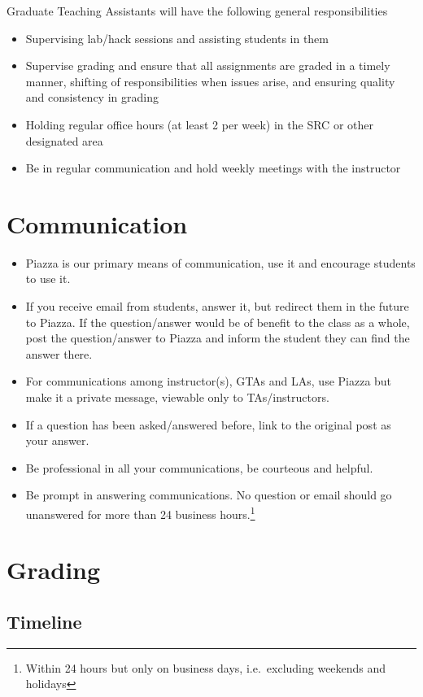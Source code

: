 \documentclass[12pt]{scrartcl}
\begin{document}
Graduate Teaching Assistants will have the following general responsibilities
\begin{itemize}
  \item Supervising lab/hack sessions and assisting students in them
  \item Supervise grading and ensure that all assignments are graded 
    in a timely manner, shifting of responsibilities when issues arise, and ensuring quality and consistency in grading
  \item Holding regular office hours (at least 2 per week) in the SRC or
    other designated area
  \item Be in regular communication and hold weekly meetings with the instructor
\end{itemize}


\section*{Communication}

\begin{itemize}
  \item Piazza is our primary means of communication, use it and encourage 
students to use it.  
  \item If you receive email from students, answer it, 
but redirect them in the future to Piazza.  If the question/answer
would be of benefit to the class as a whole, post the question/answer
to Piazza and inform the student they can find the answer there.
  \item For communications among instructor(s), GTAs and LAs, use Piazza but
make it a private message, viewable only to TAs/instructors.
  \item If a question has been asked/answered before, link to the original
  post as your answer.
  \item Be professional in all your communications, be courteous and
  helpful.  
  \item Be prompt in answering communications.  No question or email should go 
  unanswered for more than 24 business hours.\footnote{Within 24 hours but only
  on business days, i.e.\ excluding weekends and holidays}
\end{itemize}

\section*{Grading}

\subsection*{Timeline}
\end{document}
